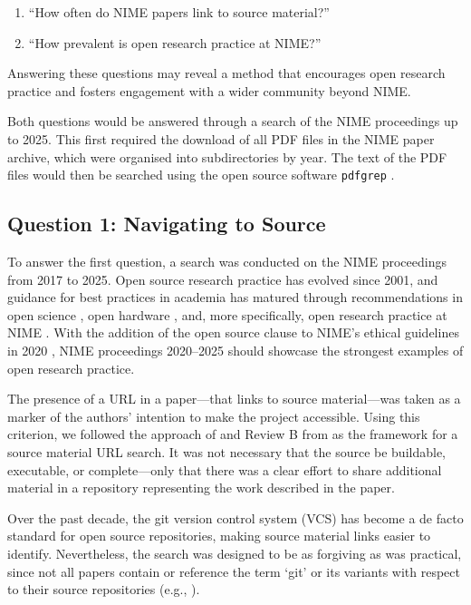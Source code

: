 \begin{enumerate}
    \item ``How often do NIME papers link to source material?''
    \item ``How prevalent is open research practice at NIME?''
\end{enumerate}

Answering these questions may reveal a method that encourages open research practice and fosters engagement with a wider community beyond NIME.

Both questions would be answered through a search of the NIME proceedings up to 2025.
This first required the download of all PDF files in the NIME paper archive, which were organised into subdirectories by year.
The text of the PDF files would then be searched using the open source software \texttt{pdfgrep} \cite{deifel_pdfgrep_2024}.

\subsection{Question 1: Navigating to Source}

To answer the first question, a search was conducted on the NIME proceedings from 2017 to 2025.
Open source research practice has evolved since 2001, and guidance for best practices in academia has matured through recommendations in open science \cite{go_fair_2016,unesco_open_2021}, open hardware \cite{oshwa_best_2013}, and, more specifically, open research practice at NIME \cite{mcpherson_nimehub_2016,jensenius_open_2019,fiordelmondo_longevity_2024}.
With the addition of the open source clause to NIME's ethical guidelines in 2020 \cite{nime_ethics_2020}, NIME proceedings 2020--2025 should showcase the strongest examples of open research practice.

The presence of a URL in a paper---that links to source material---was taken as a marker of the authors' intention to make the project accessible. Using this criterion, we followed the approach of \citet{calegario_documentation_2021} and Review B from \citet{fiordelmondo_longevity_2024} as the framework for a source material URL search. It was not necessary that the source be buildable, executable, or complete---only that there was a clear effort to share additional material in a repository representing the work described in the paper.

Over the past decade, the git version control system (VCS) has become a de facto standard for open source repositories, making source material links easier to identify.
Nevertheless, the search was designed to be as forgiving as was practical, since not all papers contain or reference the term `git' or its variants with respect to their source repositories (e.g., \cite{carter_sculpting_2025, nime2025_32}).

